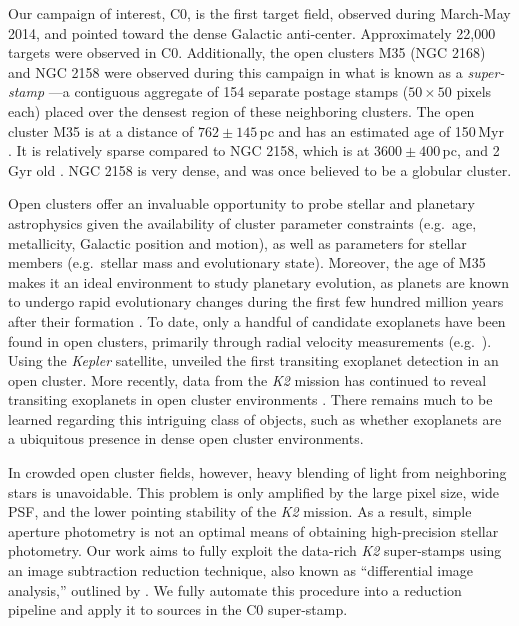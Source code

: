 \documentclass[apjl]{emulateapj}
\begin{document}
Our campaign of interest, C0, is the first target field, observed during
March-May 2014, and pointed toward the dense Galactic anti-center.
Approximately 22,000 targets were observed in C0.  Additionally, the
open clusters M35 (NGC 2168) and NGC 2158 were observed during this
campaign in what is known as a \textit{super-stamp} ---a contiguous
aggregate of 154 separate postage stamps ($50 \times 50$ pixels each)
placed over the densest region of these neighboring clusters. The open
cluster M35 is at a distance of $762\pm145$\,pc and has an estimated age
of 150\,Myr \citep{McNamara:2011}. It is relatively sparse compared to
NGC 2158, which is at $3600\pm400$\,pc, and 2\,Gyr old
\citep{Carraro:2002}. NGC 2158 is very dense, and was once believed to
be a globular cluster.

Open clusters offer an invaluable opportunity to probe stellar and
planetary astrophysics given the availability of cluster parameter
constraints (e.g.\ age, metallicity, Galactic position and motion), as
well as parameters for stellar members (e.g.\ stellar mass and
evolutionary state).  Moreover, the age of M35 makes it an ideal
environment to study planetary evolution, as planets are known to
undergo rapid evolutionary changes during the first few hundred million
years after their formation \citep{Adams:2006}.  To date, only a handful
of candidate exoplanets have been found in open clusters, primarily
through radial velocity measurements (e.g.\ \citet{Sato:2007,
  Lovis:2007, Quinn:2012, Libralato:2016}).  Using the \textit{Kepler}
satellite, \citet{Meibom:2013} unveiled the first transiting exoplanet
detection in an open cluster. More recently, data from the \textit{K2}
mission has continued to reveal transiting exoplanets in open cluster
environments \citep{Libralato:2016,Mann:2016b, Mann:2016}.  There
remains much to be learned regarding this intriguing class of objects,
such as whether exoplanets are a ubiquitous presence in dense open
cluster environments.

In crowded open cluster fields, however, heavy blending of light from
neighboring stars is unavoidable.  This problem is only amplified by the
large pixel size, wide PSF, and the lower pointing stability of the
\textit{K2} mission.  As a result, simple aperture photometry is not an
optimal means of obtaining high-precision stellar photometry.  Our work
aims to fully exploit the data-rich \textit{K2} super-stamps using an
image subtraction reduction technique, also known as ``differential
image analysis,'' outlined by \citet{Alard:1998}.  We fully automate
this procedure into a reduction pipeline and apply it to sources in the
C0 super-stamp.
\end{document}
